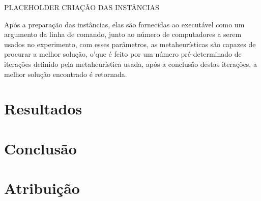 \documentclass[12pt]{article}
\begin{document}
PLACEHOLDER CRIAÇÃO DAS INSTÂNCIAS 

Após a preparação das instâncias, elas são fornecidas ao executável como um argumento da linha de comando, junto ao número de computadores a serem usados no experimento, com esses parâmetros, as metaheurísticas são capazes de procurar a melhor solução, o'que é feito por um número pré-determinado de iterações definido pela metaheurística usada, após a conclusão destas iterações,  a melhor solução encontrado é retornada.



\section{Resultados}


\section{Conclusão}


\section{Atribuição}
\end{document}
